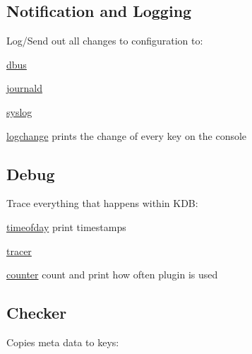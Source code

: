 \subsection*{Notification and Logging}

Log/\+Send out all changes to configuration to\+:


\begin{DoxyItemize}
\item \hyperlink{md_src_plugins_dbus_README_src_plugins_dbus_README_md}{dbus}
\item \hyperlink{md_src_plugins_journald_README_src_plugins_journald_README_md}{journald}
\item \hyperlink{md_src_plugins_syslog_README_src_plugins_syslog_README_md}{syslog}
\item \hyperlink{md_src_plugins_logchange_README_src_plugins_logchange_README_md}{logchange} prints the change of every key on the console
\end{DoxyItemize}

\subsection*{Debug}

Trace everything that happens within K\+D\+B\+:


\begin{DoxyItemize}
\item \hyperlink{md_src_plugins_timeofday_README_src_plugins_timeofday_README_md}{timeofday} print timestamps
\item \hyperlink{md_src_plugins_tracer_README_src_plugins_tracer_README_md}{tracer}
\item \hyperlink{md_src_plugins_counter_README_src_plugins_counter_README_md}{counter} count and print how often plugin is used
\end{DoxyItemize}

\subsection*{Checker}

Copies meta data to keys\+:


